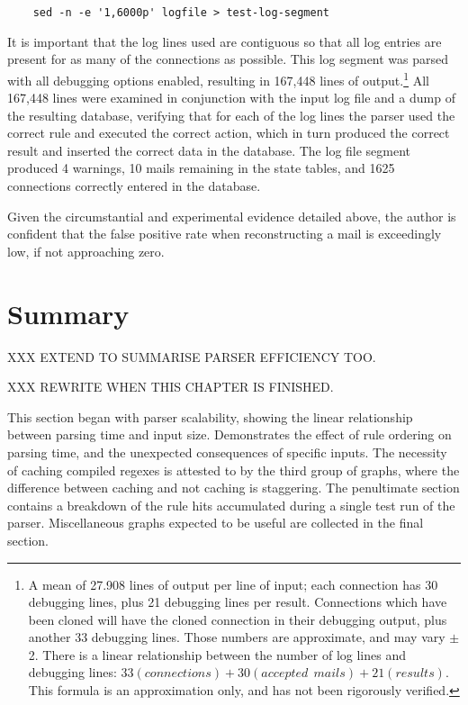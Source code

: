 \verb!    sed -n -e '1,6000p' logfile > test-log-segment!

It is important that the log lines used are contiguous so that all log
entries are present for as many of the connections as possible.  This log
segment was parsed with all debugging options enabled, resulting in 167,448
lines of output.\footnote{A mean of 27.908 lines of output per line of
input; each connection has 30 debugging lines, plus 21 debugging lines per
result.  Connections which have been cloned will have the cloned connection
in their debugging output, plus another 33 debugging lines.  Those numbers
are approximate, and may vary $\pm{}$ 2.  There is a linear relationship
between the number of log lines and debugging lines: $33(connections) +
30(accepted~~mails) + 21(results)$.  This formula is an approximation only,
and has not been rigorously verified.}  All 167,448 lines were examined in
conjunction with the input log file and a dump of the resulting database,
verifying that for each of the log lines the parser used the correct rule
and executed the correct action, which in turn produced the correct result
and inserted the correct data in the database.  The log file segment
produced 4 warnings, 10 mails remaining in the state tables, and 1625
connections correctly entered in the database.

Given the circumstantial and experimental evidence detailed above, the
author is confident that the false positive rate when reconstructing a mail
is exceedingly low, if not approaching zero.

\section{Summary}

XXX EXTEND TO SUMMARISE PARSER EFFICIENCY TOO\@.

XXX REWRITE WHEN THIS CHAPTER IS FINISHED\@.

This section began with parser scalability, showing the linear relationship
between parsing time and input size.  Demonstrates the effect of rule
ordering on parsing time, and the unexpected consequences of specific
inputs.  The necessity of caching compiled regexes is attested to by the
third group of graphs, where the difference between caching and not caching
is staggering.  The penultimate section contains a breakdown of the rule
hits accumulated during a single test run of the parser.  Miscellaneous
graphs expected to be useful are collected in the final section.

